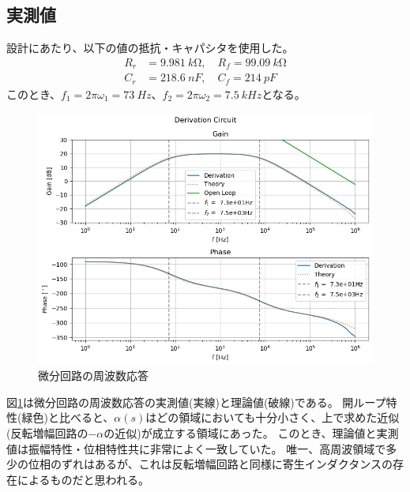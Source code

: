\documentclass[a4paper]{ltjsarticle}
\begin{document}
\subsection{実測値}
設計にあたり、以下の値の抵抗・キャパシタを使用した。
\begin{align*}
    R_r &= \SI{9.981}{k\ohm},\quad R_f = \SI{99.09}{k\ohm} \\
    C_r &= \SI{218.6}{nF},\quad C_f = \SI{214}{pF}
\end{align*}
このとき、$f_1=2\pi\omega_1 = \SI{73}{Hz}$、$f_2=2\pi\omega_2 = \SI{7.5}{kHz}$となる。
\begin{figure}[htbp]
    \centering
    \includegraphics[width=0.8\columnwidth]{./images/dervamp_bode.png}
    \caption{微分回路の周波数応答}
    \label{fig:dervamp_bode}
\end{figure}
図\ref{fig:dervamp_bode}は微分回路の周波数応答の実測値(実線)と理論値(破線)である。
開ループ特性(緑色)と比べると、$\alpha(s)$はどの領域においても十分小さく、上で求めた近似(反転増幅回路の$-\alpha$の近似)が成立する領域にあった。
このとき、理論値と実測値は振幅特性・位相特性共に非常によく一致していた。
唯一、高周波領域で多少の位相のずれはあるが、これは反転増幅回路と同様に寄生インダクタンスの存在によるものだと思われる。
\end{document}
